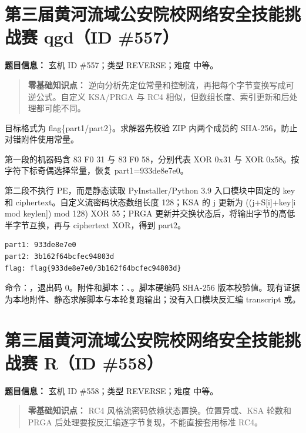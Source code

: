 \section{第三届黄河流域公安院校网络安全技能挑战赛 qgd（ID \#557）}\label{ux7b2cux4e09ux5c4aux9ec4ux6cb3ux6d41ux57dfux516cux5b89ux9662ux6821ux7f51ux7edcux5b89ux5168ux6280ux80fdux6311ux6218ux8d5b-qgdid-557}

\textbf{题目信息：} 玄机 ID \#557；类型 REVERSE；难度 中等。

\begin{quote}
\textbf{零基础知识点：} 逆向分析先定位常量和控制流，再把每个字节变换写成可逆公式。自定义 KSA/PRGA 与 RC4 相似，但数组长度、索引更新和后处理都可能不同。
\end{quote}

目标格式为 flag\{part1/part2\}。求解器先校验 ZIP 内两个成员的 SHA-256，防止对错附件使用常量。

第一段的机器码含 83 F0 31 与 83 F0 58，分别代表 XOR 0x31 与 XOR 0x58。按字符下标奇偶选择常量，恢复 part1=933de8e7e0。

第二段不执行 PE，而是静态读取 PyInstaller/Python 3.9 入口模块中固定的 key 和 ciphertext。自定义流密码状态数组长度 128；KSA 的 j 更新为 ((j+S{[}i{]}+key{[}i mod keylen{]}) mod 128) XOR 55；PRGA 更新并交换状态后，将输出字节的高低半字节互换，再与 ciphertext XOR，得到 part2。

\begin{verbatim}
part1: 933de8e7e0
part2: 3b162f64bcfec94803d
flag: flag{933de8e7e0/3b162f64bcfec94803d}
\end{verbatim}

命令：\texttt{}，退出码 0。附件和脚本：\texttt{}、\texttt{}。脚本硬编码 SHA-256 版本校验值。现有证据为本地附件、静态求解脚本与本轮复跑输出；没有入口模块反汇编 transcript 或。

\section{第三届黄河流域公安院校网络安全技能挑战赛 R（ID \#558）}\label{ux7b2cux4e09ux5c4aux9ec4ux6cb3ux6d41ux57dfux516cux5b89ux9662ux6821ux7f51ux7edcux5b89ux5168ux6280ux80fdux6311ux6218ux8d5b-rid-558}

\textbf{题目信息：} 玄机 ID \#558；类型 REVERSE；难度 中等。

\begin{quote}
\textbf{零基础知识点：} RC4 风格流密码依赖状态置换。位置异或、KSA 轮数和 PRGA 后处理要按反汇编逐字节复现，不能直接套用标准 RC4。
\end{quote}

